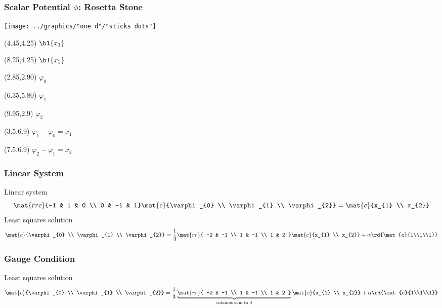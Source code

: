 \documentclass[handout]{beamer}
\begin{document}
\begin{frame}      %
\frametitle{Scalar Potential $\phi$: Rosetta Stone}
  \begin{center}
    \texttt{[image: ../graphics/"one d"/"sticks dots"]}
  \end{center}
  \begin{textblock}{2.75}(4.45,4.25)
    $\bl{x_{1}}$
  \end{textblock}
  \begin{textblock}{2.75}(8.25,4.25)
    $\bl{x_{2}}$
  \end{textblock}
  \begin{textblock}{2.75}(2.85,2.90)
    $\varphi_{0}$
  \end{textblock}
  \begin{textblock}{2.75}(6.35,5.80)
    $\varphi_{1}$
  \end{textblock}
  \begin{textblock}{2.75}(9.95,2.9)
    $\varphi_{2}$
  \end{textblock}
  \begin{textblock}{2.75}(3.5,6.9)
    $\varphi_{1} - \varphi_{0} = x_{1}$
  \end{textblock}
  \begin{textblock}{2.75}(7.5,6.9)
    $\varphi_{2} - \varphi_{1} = x_{2}$
  \end{textblock}
\end{frame}

\begin{frame}      %
\frametitle{Linear System}
  Linear system
  $$\mat{rrc}{-1 & 1 & 0 \\ 0 & -1 & 1}\mat{c}{\varphi_{0} \\ \varphi_{1} \\ \varphi_{2}} = \mat{c}{x_{1} \\ x_{2}}$$
  \bdoton
  \pause
  Least squares solution
  $$\mat{c}{\varphi_{0} \\ \varphi_{1} \\ \varphi_{2}} = \frac{1}{3} \mat{rr}{ -2 & -1 \\ 1 & -1 \\ 1 & 2 } \mat{c}{x_{1} \\ x_{2}} + \alpha \rd{\mat{c}{1\\1\\1}}$$
\end{frame}

\begin{frame}      %
\frametitle{Gauge Condition}
    Least squares solution
  $$\mat{c}{\varphi_{0} \\ \varphi_{1} \\ \varphi_{2}} = \frac{1}{3} 
  \underbrace{\mat{rr}{ -2 & -1 \\ 1 & -1 \\ 1 & 2 }}_{\text{columns sum to } 0} \mat{c}{x_{1} \\ x_{2}} + \alpha 
  				\rd{\mat{c}{1\\1\\1}}$$
\end{frame}
\end{document}
